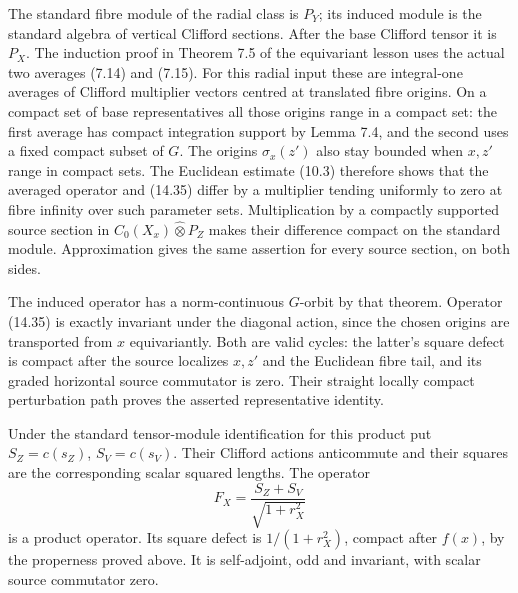 \documentclass[
  11pt,
]{article}
\begin{document}
The standard fibre module of the radial class is \(P_Y\); its induced
module is the standard algebra of vertical Clifford sections. After the
base Clifford tensor it is \(P_X\). The induction proof in Theorem 7.5
of the equivariant lesson uses the actual two averages (7.14) and
(7.15). For this radial input these are integral-one averages of
Clifford multiplier vectors centred at translated fibre origins. On a
compact set of base representatives all those origins range in a compact
set: the first average has compact integration support by Lemma 7.4, and
the second uses a fixed compact subset of \(G\). The origins
\(\sigma_x(z')\) also stay bounded when \(x,z'\) range in compact sets.
The Euclidean estimate (10.3) therefore shows that the averaged operator
and (14.35) differ by a multiplier tending uniformly to zero at fibre
infinity over such parameter sets. Multiplication by a compactly
supported source section in \(C_0(X_x)\widehat\otimes P_Z\) makes their
difference compact on the standard module. Approximation gives the same
assertion for every source section, on both sides.

The induced operator has a norm-continuous \(G\)-orbit by that theorem.
Operator (14.35) is exactly invariant under the diagonal action, since
the chosen origins are transported from \(x\) equivariantly. Both are
valid cycles: the latter's square defect is compact after the source
localizes \(x,z'\) and the Euclidean fibre tail, and its graded
horizontal source commutator is zero. Their straight locally compact
perturbation path proves the asserted representative identity.

Under the standard tensor-module identification for this product put
\(S_Z=c(s_Z)\), \(S_V=c(s_V)\). Their Clifford actions anticommute and
their squares are the corresponding scalar squared lengths. The operator
\[
F_X=\frac{S_Z+S_V}{\sqrt{1+r_X^2}}
\tag{14.36}
\] is a product operator. Its square defect is \(1/(1+r_X^2)\), compact
after \(f(x)\), by the properness proved above. It is self-adjoint, odd
and invariant, with scalar source commutator zero.
\end{document}
